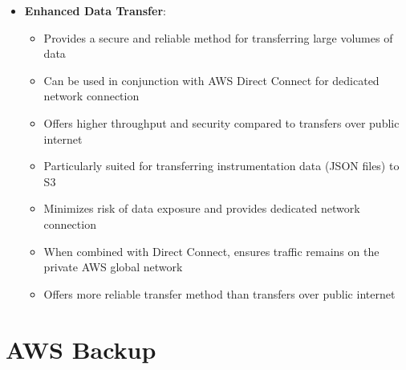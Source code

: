 \documentclass[11pt,a4paper]{report}
\begin{document}
\begin{itemize}
\begin{itemize}
  \item Offers efficient transfer with bandwidth throttling capabilities for minimal impact on production environments
\end{itemize}
  \item \textbf{Enhanced Data Transfer}:
\begin{itemize}
  \item Provides a secure and reliable method for transferring large volumes of data
  \item Can be used in conjunction with AWS Direct Connect for dedicated network connection
  \item Offers higher throughput and security compared to transfers over public internet
  \item Particularly suited for transferring instrumentation data (JSON files) to S3
  \item Minimizes risk of data exposure and provides dedicated network connection
  \item When combined with Direct Connect, ensures traffic remains on the private AWS global network
  \item Offers more reliable transfer method than transfers over public internet
\end{itemize}
\end{itemize}


\section{AWS Backup}
\end{document}
